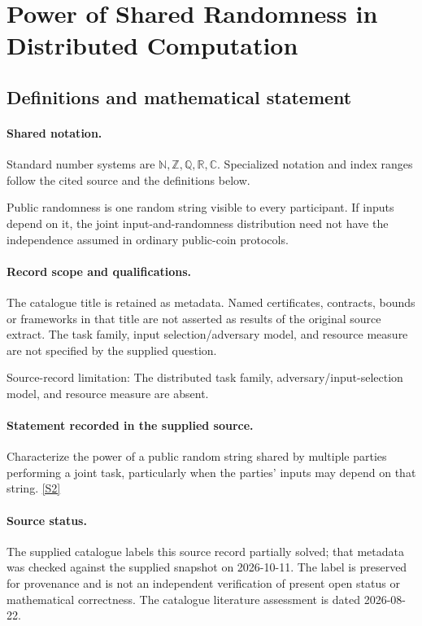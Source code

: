\documentclass[11pt]{article}
\newcommand{\sref}[2]{\hyperlink{source:#1:#2}{[S#2]}}
\begin{document}
\section{Power of Shared Randomness in Distributed Computation}\label{statement}

\subsection{Definitions and mathematical statement}

\paragraph{Shared notation.}Standard number systems are $\mathbb N,\mathbb Z,\mathbb Q,\mathbb R,\mathbb C$. Specialized notation and index ranges follow the cited source and the definitions below.


Public randomness is one random string visible to every participant. If inputs depend on it, the joint input-and-randomness distribution need not have the independence assumed in ordinary public-coin protocols.
\paragraph{Record scope and qualifications.}
The catalogue title is retained as metadata. Named certificates, contracts, bounds or frameworks in that title are not asserted as results of the original source extract.
The task family, input selection/adversary model, and resource measure are not specified by the supplied question.

Source-record limitation: The distributed task family, adversary/input-selection model, and resource measure are absent.
\paragraph{Statement recorded in the supplied source.}
Characterize the power of a public random string shared by multiple parties performing a joint task, particularly when the parties' inputs may depend on that string. \sref{statement}{2}
\paragraph{Source status.}
The supplied catalogue labels this source record partially solved; that metadata was checked against the supplied snapshot on 2026-10-11. The label is preserved for provenance and is not an independent verification of present open status or mathematical correctness. The catalogue literature assessment is dated 2026-08-22.
\end{document}
